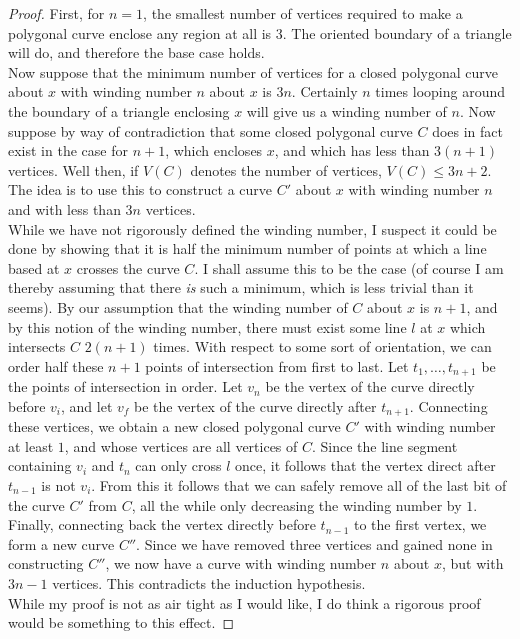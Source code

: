 \documentclass[12pt]{article}
\theoremstyle{definition}
\begin{document}
\begin{proof}

First, for $n = 1$, the smallest number of vertices required to make a polygonal curve enclose any region at all is $3$. The oriented boundary of a triangle will do, and therefore the base case holds.\\

Now suppose that the minimum number of vertices for a closed polygonal curve about $x$ with winding number $n$ about $x$ is $3n$. Certainly $n$ times looping around the boundary of a triangle enclosing $x$ will give us a winding number of $n$. Now suppose by way of contradiction that some closed polygonal curve $C$ does in fact exist in the case for $n+1$, which encloses $x$, and which has less than $3(n+1)$ vertices. Well then, if $V(C)$ denotes the number of vertices, $V(C)\le 3n + 2$. The idea is to use this to construct a curve $C'$ about $x$ with winding number $n$ and with less than $3n$ vertices. \\

While we have not rigorously defined the winding number, I suspect it could be done by showing that it is half the minimum number of points at which a line based at $x$ crosses the curve $C$. I shall assume this to be the case (of course I am thereby assuming that there \textit{is} such a minimum, which is less trivial than it seems). By our assumption that the winding number of $C$ about $x$ is $n+1$, and by this notion of the winding number, there must exist some line $l$ at $x$ which intersects $C$ $2(n+1)$ times. With respect to some sort of orientation, we can order half these $n+1$ points of intersection from first to last. Let $t_1,\dots, t_{n+1}$ be the points of intersection in order.  Let $v_n$ be the vertex of the curve directly before $v_i$, and let $v_f$ be the vertex of the curve directly after $t_{n+1}$. Connecting these vertices, we obtain a new closed polygonal curve $C'$ with winding number at least $1$, and whose vertices are all vertices of $C$. Since the line segment containing $v_i$ and $t_n$ can only cross $l$ once, it follows that the vertex direct after $t_{n-1}$ is not $v_i$. From this it follows that we can safely remove all of the last bit of the curve $C'$ from $C$, all the while only decreasing the winding number by $1$. Finally, connecting back the vertex directly before $t_{n-1}$ to the first vertex, we form a new curve $C''$. Since we have removed three vertices and gained none in constructing $C''$, we now have a curve with winding number $n$ about $x$, but with $3n-1$ vertices. This contradicts the induction hypothesis. \\


While my proof is not as air tight as I would like, I do think a rigorous proof would be something to this effect.
\end{proof}
\end{document}
